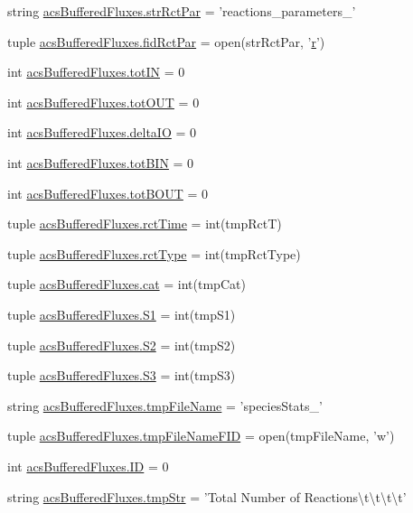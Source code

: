 \begin{DoxyCompactItemize}
\item 
string \hyperlink{a00092_ac571c8d78a216f58ebc1e37bef25a541}{acs\-Buffered\-Fluxes.\-str\-Rct\-Par} = 'reactions\-\_\-parameters\-\_\-'
\item 
tuple \hyperlink{a00092_af949c46aab0625cd7bbed10b8a484f8b}{acs\-Buffered\-Fluxes.\-fid\-Rct\-Par} = open(str\-Rct\-Par, '\hyperlink{a00025_ac862e7284527eb913b1351c8bfb8e079}{r}')
\item 
int \hyperlink{a00092_a59bf56491943c5f1414e0cc407b48b93}{acs\-Buffered\-Fluxes.\-tot\-I\-N} = 0
\item 
int \hyperlink{a00092_a730efee103fd41819ea5848cec249d07}{acs\-Buffered\-Fluxes.\-tot\-O\-U\-T} = 0
\item 
int \hyperlink{a00092_ae908941897ea01dca9c2be46363f1845}{acs\-Buffered\-Fluxes.\-delta\-I\-O} = 0
\item 
int \hyperlink{a00092_ae057f24c5c495bb01544251db7e74ad9}{acs\-Buffered\-Fluxes.\-tot\-B\-I\-N} = 0
\item 
int \hyperlink{a00092_a3da6f0cfe81256d19a801c63ccbe0c96}{acs\-Buffered\-Fluxes.\-tot\-B\-O\-U\-T} = 0
\item 
tuple \hyperlink{a00092_a8bce447521fd3dec6adb8f7603f8ea4e}{acs\-Buffered\-Fluxes.\-rct\-Time} = int(tmp\-Rct\-T)
\item 
tuple \hyperlink{a00092_a154a987096ec19ec5944920f52003171}{acs\-Buffered\-Fluxes.\-rct\-Type} = int(tmp\-Rct\-Type)
\item 
tuple \hyperlink{a00092_ad351972f8ea18b9bf9b58f572c84534e}{acs\-Buffered\-Fluxes.\-cat} = int(tmp\-Cat)
\item 
tuple \hyperlink{a00092_ab1521c41c4bbd4df7a741e0f58e760f1}{acs\-Buffered\-Fluxes.\-S1} = int(tmp\-S1)
\item 
tuple \hyperlink{a00092_a812cd646e9a7a994e7ec3eae8c2371f4}{acs\-Buffered\-Fluxes.\-S2} = int(tmp\-S2)
\item 
tuple \hyperlink{a00092_ad28d690663b4722db331f9046d80d16c}{acs\-Buffered\-Fluxes.\-S3} = int(tmp\-S3)
\item 
string \hyperlink{a00092_ae8f3277c929e5b042e62360eaffe3f22}{acs\-Buffered\-Fluxes.\-tmp\-File\-Name} = 'species\-Stats\-\_\-'
\item 
tuple \hyperlink{a00092_ad593217d9c7c4bdbdc2bbac8cec07790}{acs\-Buffered\-Fluxes.\-tmp\-File\-Name\-F\-I\-D} = open(tmp\-File\-Name, 'w')
\item 
int \hyperlink{a00092_a111fff157346d1e3888a229584206d0a}{acs\-Buffered\-Fluxes.\-I\-D} = 0
\item 
string \hyperlink{a00092_a5b34c38ff1251831412c297823a2a945}{acs\-Buffered\-Fluxes.\-tmp\-Str} = 'Total Number of Reactions\textbackslash{}t\textbackslash{}t\textbackslash{}t\textbackslash{}t'
\end{DoxyCompactItemize}
